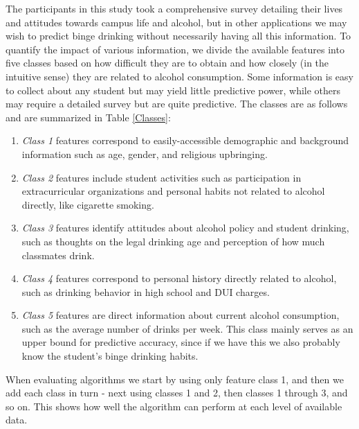 The participants in this study took a comprehensive survey detailing their lives and attitudes towards campus life and alcohol, but in other applications we may wish to predict binge drinking without necessarily having all this information.  To quantify the impact of various information, we divide the available features into five classes based on how difficult they are to obtain and how closely (in the intuitive sense) they are related to alcohol consumption.  Some information is easy to collect about any student but may yield little predictive power, while others may require a detailed survey but are quite predictive.  The classes are as follows and are summarized in Table \ref{Classes}:

\begin{enumerate}
\item \emph{Class 1} features correspond to easily-accessible demographic and background information such as age, gender, and religious upbringing.
\item \emph{Class 2} features include student activities such as participation in extracurricular organizations and personal habits not related to alcohol directly, like cigarette smoking.
\item \emph{Class 3} features identify attitudes about alcohol policy and student drinking, such as thoughts on the legal drinking age and perception of how much classmates drink.
\item \emph{Class 4} features correspond to personal history directly related to alcohol, such as drinking behavior in high school and DUI charges.
\item \emph{Class 5} features are direct information about current alcohol consumption, such as the average number of drinks per week.  This class mainly serves as an upper bound for predictive accuracy, since if we have this we also probably know the student's binge drinking habits.
\end{enumerate}

When evaluating algorithms we start by using only feature class 1, and then we add each class in turn - next using classes 1 and 2, then classes 1 through 3, and so on.  This shows how well the algorithm can perform at each level of available data.
